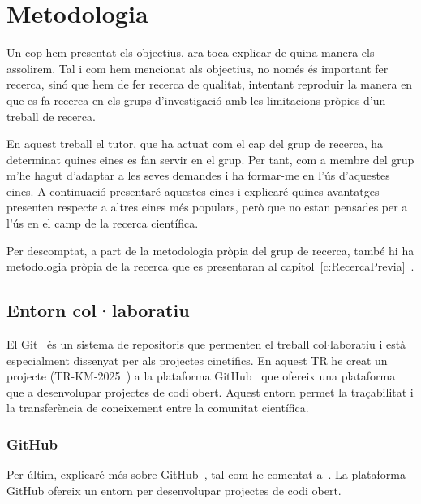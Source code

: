 \chapter{Metodologia}
\label{c:Metodologia}


Un cop hem presentat els objectius, ara toca explicar de quina manera els assolirem. Tal i com hem mencionat als objectius, no només és important fer recerca, sinó que hem de fer recerca de qualitat, intentant reproduir la manera en que es fa recerca en els grups d'investigació amb les limitacions pròpies d'un treball de recerca.

En aquest treball el tutor, que ha actuat com el cap del grup de recerca, ha determinat quines eines es fan servir en el grup. Per tant, com a membre del grup m'he hagut d'adaptar a les seves demandes i ha formar-me en l'ús d'aquestes eines. A continuació presentaré aquestes eines i explicaré quines avantatges presenten respecte a altres eines més populars, però que no estan pensades per a l'ús en el camp de la recerca científica.

Per descomptat, a part de la metodologia pròpia del grup de recerca, també hi ha metodologia pròpia de la recerca que es presentaran al capítol~\ref{c:RecercaPrevia}~.



\section{Entorn col·laboratiu} \label{sec:Entorn Col·laboratiu}

El Git~\cite{git} és un sistema de repositoris que permenten el treball col$\cdot$laboratiu i està especialment dissenyat per als projectes cinetífics. En aquest TR he creat un projecte (TR-KM-2025~\cite{TR-KM-2025}) a
la plataforma GitHub~\cite{GitHub} que ofereix una plataforma que a desenvolupar projectes de codi obert. Aquest entorn permet la traçabilitat i la transferència de coneixement entre la comunitat científica.

\subsection{GitHub} \label{c:GH}
Per últim, explicaré més sobre GitHub~\cite{GitHub}, tal com he comentat a~. La plataforma GitHub ofereix un entorn per desenvolupar projectes de codi obert.
%

